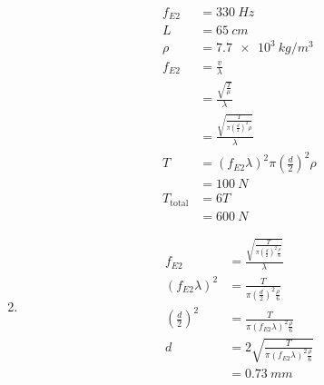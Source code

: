 \documentclass{article}
\begin{document}
\begin{enumerate}
        \begin{align*}
          f_{E2}         & = \qty{330}{Hz}                                                          \\
          L              & = \qty{65}{cm}                                                           \\
          \rho           & = \qty{7.7e3}{kg/m^3}                                                    \\
          f_{E2}         & = \frac{v}{\lambda}                                                      \\
                         & = \frac{\sqrt{\frac{T}{\mu}}}{\lambda}                                   \\
                         & = \frac{\sqrt{\frac{T}{\pi \left( \frac{d}{2} \right)^2 \rho}}}{\lambda} \\
          T              & = (f_{E2} \lambda)^2 \pi \left( \frac{d}{2} \right)^2 \rho               \\
                         & = \qty{100}{N}                                                           \\
          T_\text{total} & = 6 T                                                                    \\
                         & = \qty{600}{N}
        \end{align*}

  \item

        \begin{align*}
          f_{E2}                       & = \frac{\sqrt{\frac{T}{\pi \left( \frac{d}{2} \right)^2 \frac{\rho}{6}}}}{\lambda} \\
          (f_{E2} \lambda)^2           & = \frac{T}{\pi \left( \frac{d}{2} \right)^2 \frac{\rho}{6}}                        \\
          \left( \frac{d}{2} \right)^2 & = \frac{T}{\pi (f_{E2} \lambda)^2 \frac{\rho}{6}}                                  \\
          d                            & = 2 \sqrt{\frac{T}{\pi (f_{E2} \lambda)^2 \frac{\rho}{6}}}                         \\
                                       & = \qty{0.73}{mm}
        \end{align*}
\end{enumerate}

\subsection{}
\end{document}
